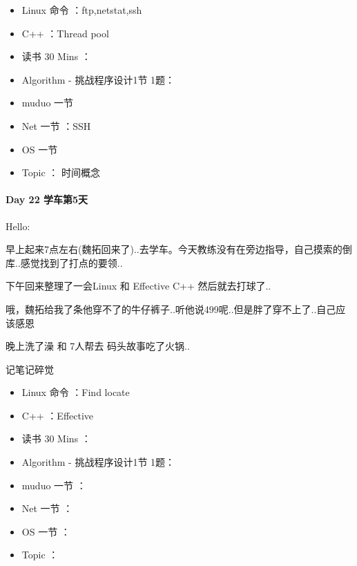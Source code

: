 \documentclass[UTF8,a4paper,8pt]{ctexart}
\begin{document}
	 	 \begin{itemize}
	 	 	\item  \makebox[0pt][l]{$\square$}\raisebox{.15ex}{\hspace{0.1em}$\checkmark$} Linux 命令 ：ftp,netstat,ssh
	 	 	\item  \makebox[0pt][l]{$\square$}\raisebox{.15ex}{\hspace{0.1em}$\checkmark$} C++ ：Thread pool
	 	 		 	 	
	 	 	\item  \makebox[0pt][l]{$\square$}\hspace{1em} 读书  30 Mins	：	 	 
	 	 	\item  \makebox[0pt][l]{$\square$}\raisebox{.15ex}{\hspace{0.1em}$\checkmark$} Algorithm - 挑战程序设计1节 1题： 
	 	 	\item  muduo 一节
	 	 	\item  \makebox[0pt][l]{$\square$}\raisebox{.15ex}{\hspace{0.1em}$\checkmark$} Net 一节 ：SSH
	 	 	\item  OS  一节
	 	 	
	 	 	\item  \makebox[0pt][l]{$\square$}\raisebox{.15ex}{\hspace{0.1em}$\checkmark$} Topic ： 时间概念
	 	 \end{itemize}
	 	 
 	 \paragraph{Day 22  学车第5天    \quad     }Hello:
	 	 
		  早上起来7点左右(魏拓回来了)..去学车。今天教练没有在旁边指导，自己摸索的倒库..感觉找到了打点的要领..
		  
		  下午回来整理了一会Linux 和 Effective C++ 然后就去打球了..
		  
		  哦，魏拓给我了条他穿不了的牛仔裤子..听他说499呢..但是胖了穿不上了..自己应该感恩
		  
		  晚上洗了澡 和 7人帮去 码头故事吃了火锅..
		  
		  记笔记碎觉
	 	  \begin{itemize}
	 	  	\item  \makebox[0pt][l]{$\square$}\raisebox{.15ex}{\hspace{0.1em}$\checkmark$} Linux 命令 ：Find locate
	 	  	\item  \makebox[0pt][l]{$\square$}\raisebox{.15ex}{\hspace{0.1em}$\checkmark$} C++ ：Effective
	 	  	
	 	  	\item   读书  30 Mins	：	 	 
	 	  	\item   Algorithm - 挑战程序设计1节 1题： 
	 	  	\item   muduo 一节 ：
	 	  	\item   Net 一节 ：
	 	  	\item   OS  一节 ：
	 	  	
	 	  	\item  \makebox[0pt][l]{$\square$}\hspace{1em} Topic ：
	 	  \end{itemize}
\end{document}
